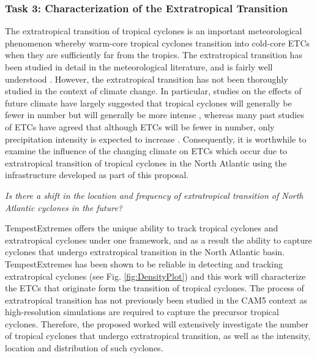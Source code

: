 \documentclass[11pt]{article}
\begin{document}
 
\subsubsection{Task 3: Characterization of the Extratropical Transition}

The extratropical transition of tropical cyclones is an important meteorological phenomenon whereby warm-core tropical cyclones transition into cold-core ETCs when they are sufficiently far from the tropics.  The extratropical transition has been studied in detail in the meteorological literature, and is fairly well understood \citep{hart2001climatology}.  However, the extratropical transition has not been thoroughly studied in the context of climate change.  In particular, studies on the effects of future climate have largely suggested that tropical cyclones will generally be fewer in number but will generally be more intense \citep{Knutson2010}, whereas many past studies of ETCs have agreed that although ETCs will be fewer in number, only precipitation intensity is expected to increase \citep{bengtsson2009will}.  Consequently, it is worthwhile to examine the influence of the changing climate on ETCs which occur due to extratropical transition of tropical cyclones in the North Atlantic using the infrastructure developed as part of this proposal.

\emph{Is there a shift in the location and frequency of extratropical transition of North Atlantic cyclones in the future?}

TempestExtremes offers the unique ability to track tropical cyclones and extratropical cyclones under one framework, and as a result the ability to capture cyclones that undergo extratropical transition in the North Atlantic basin.  TempestExtremes has been shown to be reliable in detecting and tracking extratropical cyclones (see Fig. \ref{fig:DensityPlot}) and this work will characterize the ETCs that originate form the transition of tropical cyclones. The process of extratropical transition has not previously been studied in the CAM5 context as high-resolution simulations are required to capture the precursor tropical cyclones. Therefore, the proposed worked will extensively investigate the number of tropical cyclones that undergo extratropical transition, as well as the intensity, location and distribution of such cyclones.  
\end{document}
